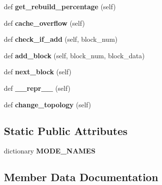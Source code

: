 \begin{DoxyCompactItemize}
def {\bfseries get\+\_\+rebuild\+\_\+percentage} (self)
\item 
\mbox{\label{class_r_a_i_d5_1_1frontend_1_1utilities_1_1cache_1_1_cache_a5ac35bef5b86de566c13e0cb0832dd67}} 
def {\bfseries cache\+\_\+overflow} (self)
\item 
\mbox{\label{class_r_a_i_d5_1_1frontend_1_1utilities_1_1cache_1_1_cache_a98196b88f82ad135c91e7efbdf168fcc}} 
def {\bfseries check\+\_\+if\+\_\+add} (self, block\+\_\+num)
\item 
\mbox{\label{class_r_a_i_d5_1_1frontend_1_1utilities_1_1cache_1_1_cache_a261747ad7f810e40d7144f284e81ab82}} 
def {\bfseries add\+\_\+block} (self, block\+\_\+num, block\+\_\+data)
\item 
\mbox{\label{class_r_a_i_d5_1_1frontend_1_1utilities_1_1cache_1_1_cache_a83490907d4b89b8eb55adcee2724fcd8}} 
def {\bfseries next\+\_\+block} (self)
\item 
\mbox{\label{class_r_a_i_d5_1_1frontend_1_1utilities_1_1cache_1_1_cache_ad17acc2c8e019c094731924aae02449f}} 
def {\bfseries \+\_\+\+\_\+repr\+\_\+\+\_\+} (self)
\item 
\mbox{\label{class_r_a_i_d5_1_1frontend_1_1utilities_1_1cache_1_1_cache_a3268ce895eebcfaa06390635d8f089e6}} 
def {\bfseries change\+\_\+topology} (self)
\end{DoxyCompactItemize}
\subsection*{Static Public Attributes}
\begin{DoxyCompactItemize}
\item 
dictionary {\bfseries M\+O\+D\+E\+\_\+\+N\+A\+M\+ES}
\end{DoxyCompactItemize}


\subsection{Member Data Documentation}
\mbox{\label{class_r_a_i_d5_1_1frontend_1_1utilities_1_1cache_1_1_cache_aaa21f9f1cae2d6df8f9ffaab0f0230e0}} 
